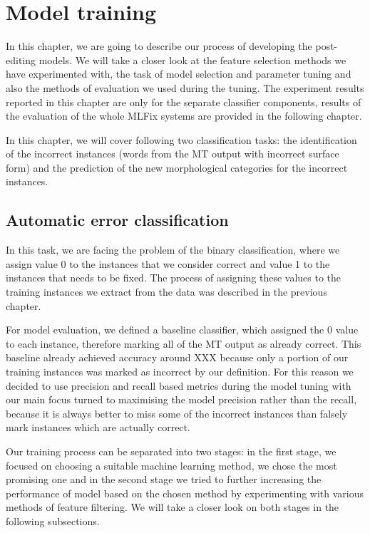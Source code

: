 \chapter{Model training}

In this chapter, we are going to describe our process of developing
the post-editing models. We will take a closer look at the feature selection
methods we have experimented with, the task of model selection and parameter
tuning and also the methods of evaluation we used during the tuning.
The experiment results reported in this chapter are only for the separate
classifier components, results of the evaluation of the whole MLFix systems
are provided in the following chapter.

In this chapter, we will cover following two classification tasks: the identification
of the incorrect instances (words from the MT output with incorrect surface form)
and the prediction of the new morphological categories for the incorrect instances.

\section{Automatic error classification}


In this task, we are facing the problem of the binary classification, where we
assign value 0 to the instances that we consider correct and value 1 to the
instances that needs to be fixed. The process of assigning these values to the
training instances we extract from the data was described in the previous chapter.

For model evaluation, we defined a baseline classifier, which assigned the 0 value
to each instance, therefore marking all of the MT output as already correct.
This baseline already achieved accuracy around XXX because only a portion of our
training instances was marked as incorrect by our definition. For this reason
we decided to use precision and recall based metrics during the model tuning with
our main focus turned to maximising the model precision rather than the recall,
because it is always better to miss some of the incorrect instances than falsely mark
instances which are actually correct.

Our training process can be separated into two stages: in the first stage, we
focused on choosing a suitable machine learning method, we chose the most promising
one and in the second stage we tried to further increasing the performance of model
based on the chosen method by experimenting with various methods of feature filtering.
We will take a closer look on both stages in the following subsections.

